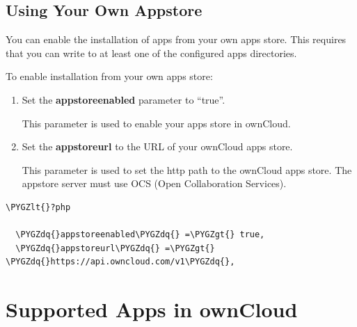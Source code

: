 \documentclass[letterpaper,10pt,english]{sphinxmanual}
\def\PYGZlt{\char`\<}
\def\PYGZgt{\char`\>}
\def\PYGZdq{\char`\"}
\begin{document}
\subsection{Using Your Own Appstore}
\label{installation/apps_management_installation:using-your-own-appstore}
You can enable the installation of apps from your own apps store. This requires that you
can write to at least one of the configured apps directories.

To enable installation from your own apps store:
\begin{enumerate}
\item {} 
Set the \textbf{appstoreenabled} parameter to ``true''.

This parameter is used to enable your apps store in ownCloud.

\item {} 
Set the \textbf{appstoreurl} to the URL of your ownCloud apps store.

This parameter is used to set the http path to the ownCloud apps store. The appstore
server must use \textsc{OCS} (Open Collaboration Services).

\end{enumerate}

\begin{Verbatim}[commandchars=\\\{\}]
\PYGZlt{}?php

  \PYGZdq{}appstoreenabled\PYGZdq{} =\PYGZgt{} true,
  \PYGZdq{}appstoreurl\PYGZdq{} =\PYGZgt{} \PYGZdq{}https://api.owncloud.com/v1\PYGZdq{},
\end{Verbatim}


\section{Supported Apps in ownCloud}
\label{installation/apps_supported::doc}\label{installation/apps_supported:supported-apps-in-owncloud}
\end{document}
